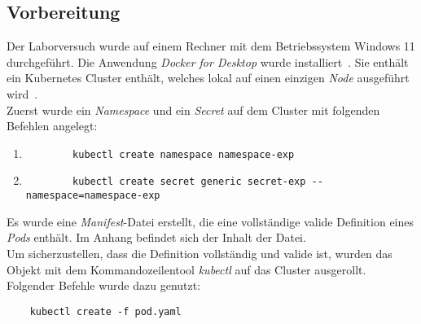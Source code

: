 \subsection{Vorbereitung}
Der Laborversuch wurde auf einem Rechner mit dem Betriebssystem Windows 11 durchgeführt.
Die Anwendung \textit{Docker for Desktop} wurde installiert~\cite{docker-for-desktop-overview}. Sie enthält ein Kubernetes Cluster enthält,
welches lokal auf einen einzigen \textit{Node} ausgeführt wird~\cite{docker-for-desktop-kubernetes}.
\\
Zuerst wurde ein \textit{Namespace} und ein \textit{Secret} auf dem Cluster mit folgenden Befehlen angelegt:
\begin{enumerate}
  \item
        \begin{verbatim}
        kubectl create namespace namespace-exp
    \end{verbatim}
  \item
        \begin{verbatim}
        kubectl create secret generic secret-exp --namespace=namespace-exp
    \end{verbatim}
\end{enumerate}
Es wurde eine \textit{Manifest}-Datei erstellt, die eine vollständige valide Definition eines \textit{Pods} enthält.
Im Anhang befindet sich der Inhalt der Datei.
\\
Um sicherzustellen, dass die Definition vollständig und valide ist, wurden das Objekt mit dem Kommandozeilentool \textit{kubectl} auf das Cluster ausgerollt.
Folgender Befehle wurde dazu genutzt:

\begin{verbatim}
    kubectl create -f pod.yaml
\end{verbatim}

